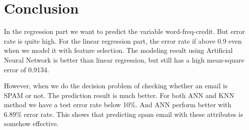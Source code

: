\section{Conclusion}
In the regression part we want to predict the variable word-freq-credit. But error rate is quite high. For the linear regression part, the error rate if above 0.9 even when we model it with feature selection. The modeling result using Artificial Neural Network is better than linear regression, but still has a high mean-square error of 0.9134.

However, when we do the decision problem of checking whether an email is SPAM or not. The prediction result is much better. For both ANN and KNN method we have a test error rate below 10\%. And ANN perform better with 6.89\% error rate. This shows that predicting spam email with these attributes is somehow effective.